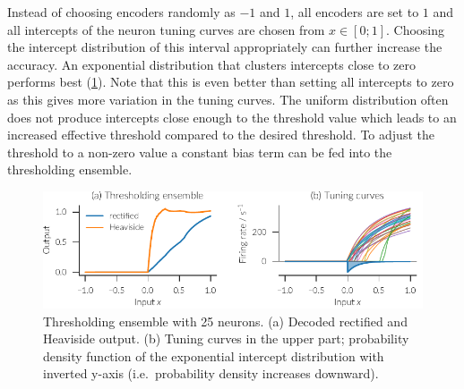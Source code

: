 Instead of choosing encoders randomly as $-1$ and $1$, all encoders are set to $1$ and all intercepts of the neuron tuning curves are chosen from $x \in [0; 1]$.
Choosing the intercept distribution of this interval appropriately can further increase the accuracy.
An exponential distribution that clusters intercepts close to zero performs best (\cref{fig:thresholding}).
Note that this is even better than setting all intercepts to zero as this gives more variation in the tuning curves.
The uniform distribution often does not produce intercepts close enough to the threshold value which leads to an increased effective threshold compared to the desired threshold.
To adjust the threshold to a non-zero value a constant bias term can be fed into the thresholding ensemble.
\begin{figure}
    \centering
    \includegraphics{figures/thresholding}
    \caption[Thresholding ensemble]{Thresholding ensemble with 25 neurons. (a) Decoded rectified and Heaviside output.  (b) Tuning curves in the upper part; probability density function of the exponential intercept distribution with inverted y-axis (i.e.\ probability density increases downward).}\label{fig:thresholding}
\end{figure}


